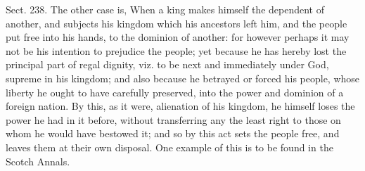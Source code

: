 \documentclass[11pt,openany]{book}
\begin{document}
Sect. 238. The other case is, When a king makes himself the dependent of another, and subjects his kingdom which his ancestors left him, and the people put free into his hands, to the dominion of another: for however perhaps it may not be his intention to prejudice the people; yet because he has hereby lost the principal part of regal dignity, viz. to be next and immediately under God, supreme in his kingdom; and also because he betrayed or forced his people, whose liberty he ought to have carefully preserved, into the power and dominion of a foreign nation. By this, as it were, alienation of his kingdom, he himself loses the power he had in it before, without transferring any the least right to those on whom he would have bestowed it; and so by this act sets the people free, and leaves them at their own disposal. One example of this is to be found in the Scotch Annals.
\end{document}

